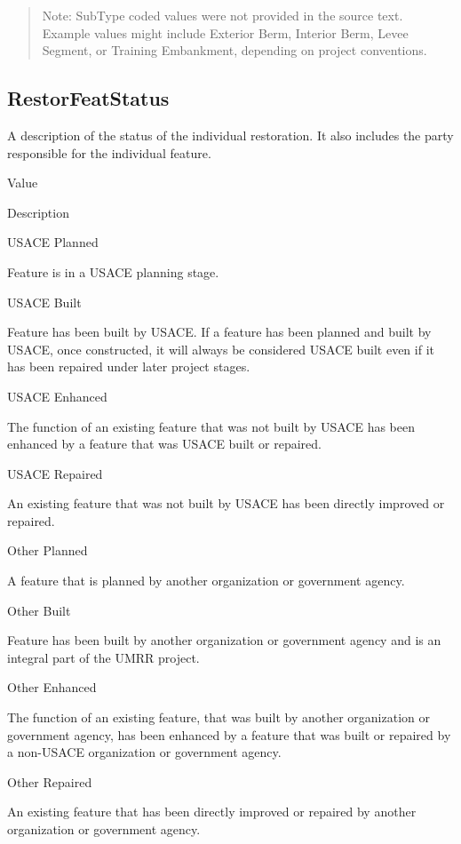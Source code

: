 \documentclass[
  letterpaper,
  DIV=11,
  numbers=noendperiod]{scrreprt}
\begin{document}
\begin{quote}
Note: SubType coded values were not provided in the source text.\\
Example values might include Exterior Berm, Interior Berm, Levee
Segment, or Training Embankment, depending on project conventions.
\end{quote}

\subsection{RestorFeatStatus}\label{restorfeatstatus-1}

A description of the status of the individual restoration. It also
includes the party responsible for the individual feature.

Value

Description

USACE Planned

Feature is in a USACE planning stage.

USACE Built

Feature has been built by USACE. If a feature has been planned and built
by USACE, once constructed, it will always be considered USACE built
even if it has been repaired under later project stages.

USACE Enhanced

The function of an existing feature that was not built by USACE has been
enhanced by a feature that was USACE built or repaired.

USACE Repaired

An existing feature that was not built by USACE has been directly
improved or repaired.

Other Planned

A feature that is planned by another organization or government agency.

Other Built

Feature has been built by another organization or government agency and
is an integral part of the UMRR project.

Other Enhanced

The function of an existing feature, that was built by another
organization or government agency, has been enhanced by a feature that
was built or repaired by a non-USACE organization or government agency.

Other Repaired

An existing feature that has been directly improved or repaired by
another organization or government agency.
\end{document}
